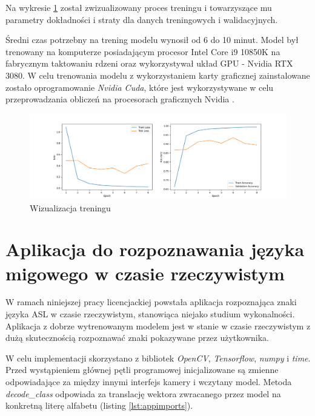 \documentclass[a4paper,12pt,oneside]{book} %
\begin{document}
Na wykresie \ref{model_train} został zwizualizowany proces treningu i towarzyszące mu parametry dokładności i straty dla danych treningowych i walidacyjnych.

Średni czas potrzebny na trening modelu wynosił od 6 do 10 minut. Model był trenowany na komputerze posiadającym procesor Intel Core i9 10850K na fabrycznym taktowaniu rdzeni oraz wykorzystywał układ GPU - Nvidia RTX 3080. W celu trenowania modelu z wykorzystaniem karty graficznej zainstalowane zostało oprogramowanie \emph{Nvidia Cuda}, które jest wykorzystywane w celu przeprowadzania obliczeń na procesorach graficznych Nvidia \cite{cuda}.

\begin{figure}[h]
	\centering
	\hspace*{-3cm} 
	\includegraphics[scale=0.4]{train.png}
	\caption{Wizualizacja treningu}
	\label{model_train}
\end{figure}

\section{Aplikacja do rozpoznawania języka migowego w czasie rzeczywistym}

W ramach niniejszej pracy licencjackiej powstała aplikacja rozpoznająca znaki języka ASL w czasie rzeczywistym, stanowiąca niejako studium wykonalności. Aplikacja z dobrze wytrenowanym modelem jest w stanie w czasie rzeczywistym z dużą skutecznością rozpoznawać znaki pokazywane przez użytkownika.

W celu implementacji skorzystano z bibliotek \emph{OpenCV}, \emph{Tensorflow}, \emph{numpy} i \emph{time}. Przed wystąpieniem głównej pętli programowej inicjalizowane są zmienne odpowiadające za między innymi interfejs kamery i wczytany model. Metoda \emph{decode\_class} odpowiada za translację wektora zwracanego przez model na konkretną literę alfabetu (listing \ref{lst:appimports}).
\end{document}
